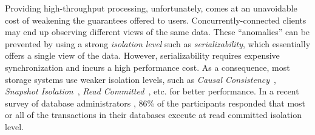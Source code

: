 
Providing high-throughput processing, unfortunately, comes at an unavoidable cost of weakening 
the guarantees offered to users.
Concurrently-connected clients may end up observing different views of the same data. 
These ``anomalies'' can be prevented by using a strong \textit{isolation level} 
such as \textit{serializability}, which essentially offers a single view of the
data. However, serializability requires expensive synchronization and incurs a high performance cost. As a
consequence, most storage systems use weaker isolation levels, such as 
{\it Causal Consistency}~\cite{DBLP:journals/cacm/Lamport78,DBLP:conf/sosp/LloydFKA11,antidote-white-paper},
{\it Snapshot Isolation}~\cite{DBLP:conf/sigmod/BerensonBGMOO95}, {\it Read
Committed}~\cite{DBLP:conf/sigmod/BerensonBGMOO95}, etc. for better performance.
In a recent survey of
database administrators \cite{survey}, 86\% of the participants responded that
most or all of the transactions in their databases execute at read committed isolation level.

